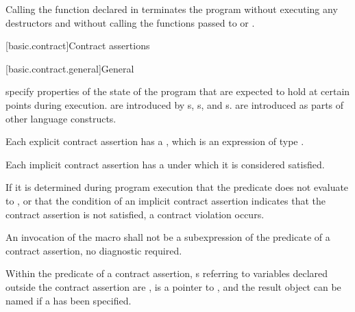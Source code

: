 \pnum
{}%
%
%
Calling the function  declared in
 terminates the program without executing any destructors
and without calling
the functions passed to  or .%

[basic.contract]{Contract assertions}%
%

[basic.contract.general]{General}%

\pnum
{}
specify
properties of the state of the program
that are expected to hold at
certain points during execution.
 are introduced by
s,
s, and
s.
 are introduced
as parts of other language constructs.

\pnum
Each explicit contract assertion
has a ,
which is an expression of type .

\pnum
Each implicit contract assertion
has a 
under which it is considered satisfied.

\begin{note}
If it is determined
during program execution
that the predicate does not evaluate
to ,
or that the condition of an implicit contract assertion
indicates that the contract assertion is not satisfied,
a contract violation occurs.
\end{note}

\pnum
An invocation of the macro 
shall not be a subexpression
of the predicate of a contract assertion,
no diagnostic required.

\pnum
\begin{note}
Within the predicate of a contract assertion,
s referring to
variables declared outside the contract assertion
are ,
 is a pointer to ,
and the result object can be named
if a  has been specified.
\end{note}

